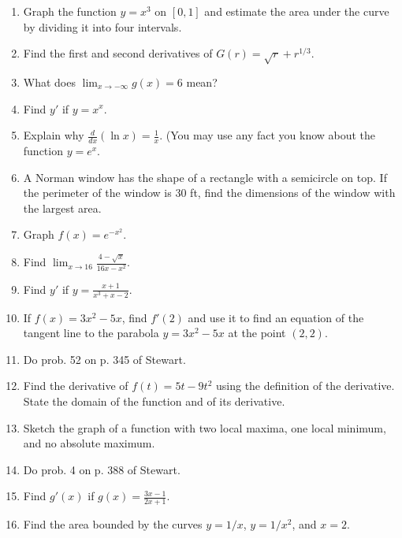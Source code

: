\documentclass[12pt]{article}
\begin{document}
\begin{enumerate}[(1)]
\item
Graph the function $y = x^3$ on $[0, 1]$ and estimate the area under the curve
by dividing it into four intervals.


\item
Find the first and second derivatives of $G(r) = \sqrt{r} + r^{1/3}$.

\item
What does $\lim_{x \rightarrow -\infty} g(x) = 6$ mean?

\item
Find $y'$ if $y = x^x$.

\item
Explain why $\frac{d}{dx}(\ln x) = \frac{1}{x}$. (You may use any fact you know
about the function $y = e^x$.

\item
A Norman window has the shape of a rectangle with a semicircle on top.
If the perimeter of the window is 30 ft, find the dimensions of the window
with the largest area.

\item
Graph $f(x) = e^{-x^2}$.

\item
Find $\lim_{x \rightarrow 16} \frac{4 - \sqrt{x}}{16 x - x^2}$.

\item
Find $y'$ if $y= \frac{x + 1}{x^3 + x - 2}$.

\item
If $f(x) = 3x^2 - 5x$, find $f'(2)$ and use it to find an equation of the tangent
line to the parabola $y = 3x^2 - 5x$ at the point $(2, 2)$.

\item
Do prob. 52 on p. 345 of Stewart.

\item
Find the derivative of $f(t) = 5t - 9t^2$ using the definition of the derivative.
State the domain of the function and of its derivative.

\item
Sketch the graph of a function with two local maxima, one local minimum, and no
absolute maximum.

\item
Do prob. 4 on p. 388 of Stewart.

\item
Find $g'(x)$ if $g(x) = \frac{3x - 1}{2x + 1}$.

\item
Find the area bounded by the curves $y = 1/x$, $y = 1/x^2$, and $x = 2$.


\end{enumerate}
\end{document}
